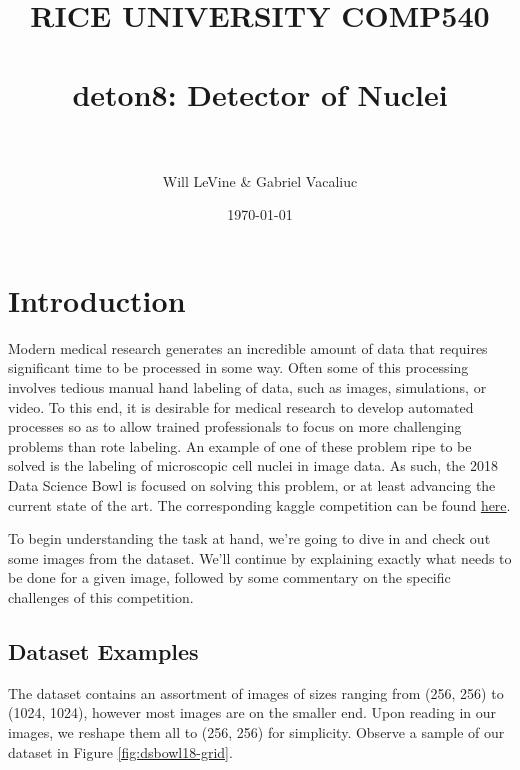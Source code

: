 \documentclass[paper=letter, fontsize=12pt]{article}
\title{
\normalfont \normalsize
\textsc{RICE UNIVERSITY COMP540} \\ [25pt]
\horrule{0.5pt} \\[0.4cm] %
\huge deton8: Detector of Nuclei \\ %
\horrule{2pt} \\[0.5cm] %
}
\author{Will LeVine \& Gabriel Vacaliuc}
\date{\normalsize\today}
\numberwithin{equation}{section} %
\numberwithin{figure}{section} %
\numberwithin{table}{section} %
\begin{document}
\maketitle

\begin{abstract}
    \blindtext
\end{abstract}

\newpage

\tableofcontents

\newpage



\section{Introduction}

Modern medical research generates an incredible amount of data that requires
significant time to be processed in some way.  Often some of this processing
involves tedious manual hand labeling of data, such as images, simulations, or
video.  To this end, it is desirable for medical research to develop automated
processes so as to allow trained professionals to focus on more challenging
problems than rote labeling.  An example of one of these problem ripe to be
solved is the labeling of microscopic cell nuclei in image data.  As such, the
2018 Data Science Bowl is focused on solving this problem, or at least
advancing the current state of the art.  The corresponding kaggle competition
can be found \href{https://www.kaggle.com/c/data-science-bowl-2018}{here}.

To begin understanding the task at hand, we're going to dive in and check out
some images from the dataset.  We'll continue by explaining exactly what needs
to be done for a given image, followed by some commentary on the specific
challenges of this competition.

\subsection{Dataset Examples}

The dataset contains an assortment of images of sizes ranging from (256, 256)
to (1024, 1024), however most images are on the smaller end.  Upon reading in
our images, we reshape them all to (256, 256) for simplicity.  Observe a sample
of our dataset in Figure \ref{fig:dsbowl18-grid}.
\end{document}
